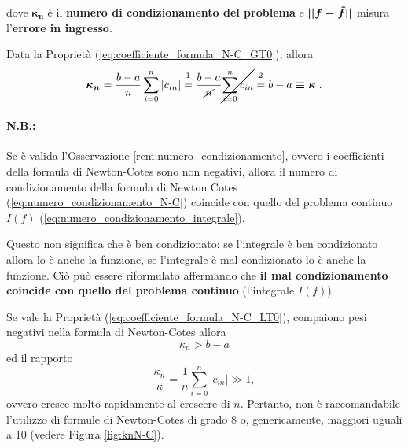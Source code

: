 
\noindent dove $\boldsymbol{\kappa_n}$ è il \textbf{numero di condizionamento del problema} e $\boldsymbol{||f-\Tilde{f}||}$ misura l'\textbf{errore in ingresso}.

\begin{remark}\label{rem:numero_condizionamento}
    Data la Proprietà (\ref{eq:coefficiente_formula_N-C_GT0}), allora
    \begin{equation}\label{eq:numero_condizionamento_N-C_positivo}
     \boldsymbol{\kappa_n}=\frac{b-a}{n}\sum_{i=0}^n|c_{in}|\overset{\footnotemark}{=}\frac{b-a}{\cancel{n}}\cancel{\sum_{i=0}^nc_{in}}\overset{\footnotemark}{=}b-a\boldsymbol{\equiv\kappa}.
    \end{equation}
\end{remark}
\addtocounter{footnote}{-1}


\paragraph{N.B.:} Se è valida l'Osservazione \ref{rem:numero_condizionamento}, ovvero i coefficienti della formula di Newton-Cotes sono non negativi, allora il numero di condizionamento della formula di Newton Cotes (\ref{eq:numero_condizionamento_N-C}) coincide con quello del problema continuo $I(f)$ (\ref{eq:numero_condizionamento_integrale}).

Questo non significa che è ben condizionato: se l'integrale è ben condizionato allora lo è anche la funzione, se l'integrale è mal condizionato lo è anche la funzione. Ciò può essere riformulato affermando che \textbf{il mal condizionamento coincide con quello del problema continuo} (l'integrale $I(f)$).

\begin{remark}
	Se vale la Proprietà (\ref{eq:coefficiente_formula_N-C_LT0}), compaiono pesi negativi nella formula di Newton-Cotes allora 
	\begin{equation*}
		\kappa_n> b-a
	\end{equation*}
	ed il rapporto \begin{equation*}
		\frac{\kappa_n}{\kappa}=\frac{1}{n}\sum_{i=0}^n|c_{in}| \gg 1,
	\end{equation*}
	ovvero cresce molto rapidamente al crescere di $n$. Pertanto, non è raccomandabile l'utilizzo di formule di Newton-Cotes di grado 8 o, genericamente, maggiori uguali a 10 (vedere Figura \ref{fig:knN-C}).
\end{remark}

